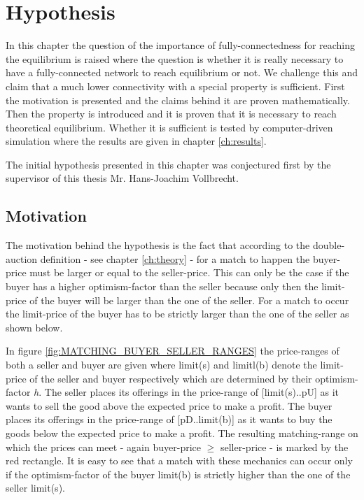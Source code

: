 \documentclass[Bachelorarbeit.tex]{subfiles}
\begin{document}
\graphicspath{{./figures/hypothesis/}}	%

\chapter{Hypothesis}
\label{ch:hypothesis}

In this chapter the question of the importance of fully-connectedness for reaching the equilibrium is raised where the question is whether it is really necessary to have a fully-connected network to reach equilibrium or not. We challenge this and claim that a much lower connectivity with a special property is sufficient. First the motivation is presented and the claims behind it are proven mathematically. Then the property is introduced and it is proven that it is necessary to reach theoretical equilibrium. Whether it is sufficient is tested by computer-driven simulation where the results are given in chapter \ref{ch:results}.

\medskip

The initial hypothesis presented in this chapter was conjectured first by the supervisor of this thesis Mr. Hans-Joachim Vollbrecht.

\section{Motivation}
The motivation behind the hypothesis is the fact that according to the double-auction definition - see chapter \ref{ch:theory} - for a match to happen the buyer-price must be larger or equal to the seller-price. This can only be the case if the buyer has a higher optimism-factor than the seller because only then the limit-price of the buyer will be larger than the one of the seller. For a match to occur the limit-price of the buyer has to be strictly larger than the one of the seller as shown below.

\medskip

In figure \ref{fig:MATCHING_BUYER_SELLER_RANGES} the price-ranges of both a seller and buyer are given where limit(s) and limitl(b) denote the limit-price of the seller and buyer respectively which are determined by their optimism-factor \textit{h}. The seller places its offerings in the price-range of [limit(s)..pU] as it wants to sell the good above the expected price to make a profit. The buyer places its offerings in the price-range of [pD..limit(b)] as it wants to buy the goods below the expected price to make a profit. The resulting matching-range on which the prices can meet - again buyer-price $\geq$ seller-price - is marked by the red rectangle. It is easy to see that a match with these mechanics can occur only if the optimism-factor of the buyer limit(b) is strictly higher than the one of the seller limit(s).
\end{document}
